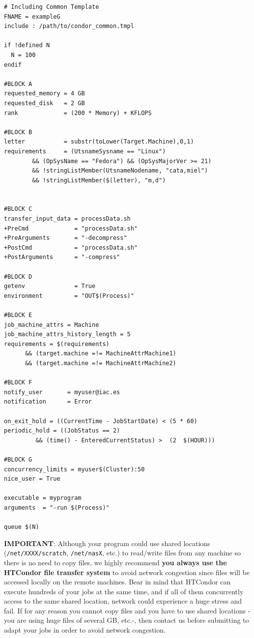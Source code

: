 \documentclass[a4paper,10pt]{article}
\begin{document}
\begin{verbatim}
# Including Common Template
FNAME = exampleG
include : /path/to/condor_common.tmpl

if !defined N
  N = 100
endif

#BLOCK A
requested_memory = 4 GB
requested_disk   = 2 GB
rank             = (200 * Memory) + KFLOPS

#BLOCK B
letter           = substr(toLower(Target.Machine),0,1)
requirements     = (UtsnameSysname == "Linux") 
        && (OpSysName == "Fedora") && (OpSysMajorVer >= 21) 
        && !stringListMember(UtsnameNodename, "cata,miel")
        && !stringListMember($(letter), "m,d")


#BLOCK C
transfer_input_data = processData.sh
+PreCmd             = "processData.sh"
+PreArguments       = "-decompress"
+PostCmd            = "processData.sh"
+PostArguments      = "-compress"

#BLOCK D
getenv              = True
environment         = "OUT$(Process)"

#BLOCK E
job_machine_attrs = Machine  
job_machine_attrs_history_length = 5           
requirements = $(requirements) 
      && (target.machine =!= MachineAttrMachine1)  
      && (target.machine =!= MachineAttrMachine2)

#BLOCK F
notify_user       = myuser@iac.es
notification      = Error

on_exit_hold = ((CurrentTime - JobStartDate) < (5 * 60)
periodic_hold = ((JobStatus == 2) 
         && (time() - EnteredCurrentStatus) >  (2  $(HOUR)))

#BLOCK G
concurrency_limits = myuser$(Cluster):50
nice_user = True

executable = myprogram
arguments  = "-run $(Process)"

queue $(N) 
\end{verbatim}


\begin{mdframed}
\textbf{IMPORTANT}: Although your program could use shared locations
(\texttt{/net/XXXX/scratch}, \texttt{/net/nasX}, etc.) to read/write files from any machine so
there is no need to copy files, we highly recommend \textbf{you always use the HTCondor
file transfer system} to avoid network congestion since files will be accessed
locally on the remote machines. Bear in mind that HTCondor can execute hundreds
of your jobs at the same time, and if all of them concurrently access to the
same shared location, network could experience a huge stress and fail. If for
any reason you cannot copy files and you have to use shared locations -you are
using huge files of several GB, etc.-, then contact us before submitting to
adapt your jobs in order to avoid network congestion. 
\end{mdframed}
\end{document}
